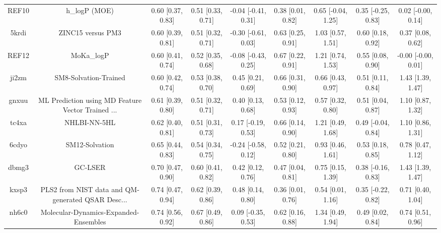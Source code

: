 \documentclass{article}
\begin{document}
\begin{center}
\begin{longtable}{|ccccccccc|}
 REF10 &                                      h\_logP (MOE) &  0.60 [0.37, 0.83] &  0.51 [0.33, 0.71] &   -0.04 [-0.41, 0.31] &  0.38 [0.01, 0.82] &   0.65 [-0.04, 1.25] &   0.35 [-0.25, 0.83] &    0.02 [-0.00, 0.14] \\
 5krdi &                                  ZINC15 versus PM3 &  0.60 [0.39, 0.81] &  0.51 [0.32, 0.71] &   -0.30 [-0.61, 0.03] &  0.63 [0.25, 0.91] &    1.03 [0.57, 1.51] &    0.60 [0.18, 0.92] &     0.37 [0.08, 0.62] \\
 REF12 &                                         MoKa\_logP &  0.60 [0.41, 0.74] &  0.52 [0.35, 0.68] &   -0.08 [-0.43, 0.25] &  0.67 [0.22, 0.91] &    1.21 [0.74, 1.53] &    0.55 [0.08, 0.90] &   -0.00 [-0.00, 0.01] \\
 ji2zm &                              SM8-Solvation-Trained &  0.60 [0.42, 0.74] &  0.53 [0.38, 0.70] &     0.45 [0.21, 0.69] &  0.66 [0.31, 0.90] &    0.66 [0.43, 0.97] &    0.51 [0.11, 0.84] &     1.43 [1.39, 1.47] \\
 gnxuu &  ML Prediction using MD Feature Vector Trained ... &  0.61 [0.39, 0.80] &  0.51 [0.32, 0.71] &     0.40 [0.13, 0.68] &  0.53 [0.12, 0.93] &    0.57 [0.32, 0.80] &    0.51 [0.04, 0.87] &     1.10 [0.87, 1.32] \\
 tc4xa &                                       NHLBI-NN-5HL &  0.62 [0.40, 0.81] &  0.51 [0.31, 0.73] &    0.17 [-0.19, 0.53] &  0.66 [0.14, 0.90] &    1.21 [0.49, 1.68] &   0.49 [-0.04, 0.84] &     1.10 [0.86, 1.31] \\
 6cdyo &                                     SM12-Solvation &  0.65 [0.44, 0.83] &  0.54 [0.34, 0.75] &   -0.24 [-0.58, 0.12] &  0.52 [0.21, 0.80] &    0.93 [0.46, 1.61] &    0.53 [0.18, 0.85] &     0.78 [0.47, 1.12] \\
 dbmg3 &                                            GC-LSER &  0.70 [0.47, 0.90] &  0.60 [0.41, 0.82] &     0.42 [0.12, 0.76] &  0.47 [0.04, 0.81] &    0.75 [0.15, 1.39] &   0.38 [-0.16, 0.83] &     1.43 [1.39, 1.47] \\
 kxsp3 &  PLS2 from NIST data and QM-generated QSAR Desc... &  0.74 [0.47, 0.94] &  0.62 [0.39, 0.86] &     0.48 [0.14, 0.80] &  0.36 [0.01, 0.76] &    0.54 [0.01, 1.16] &   0.35 [-0.22, 0.82] &     0.71 [0.40, 1.04] \\
 nh6c0 &              Molecular-Dynamics-Expanded-Ensembles &  0.74 [0.56, 0.92] &  0.67 [0.49, 0.86] &    0.09 [-0.35, 0.53] &  0.62 [0.16, 0.88] &    1.34 [0.49, 1.94] &    0.49 [0.02, 0.84] &     0.74 [0.51, 0.96] \\

\end{longtable}
\end{center}
\end{document}
